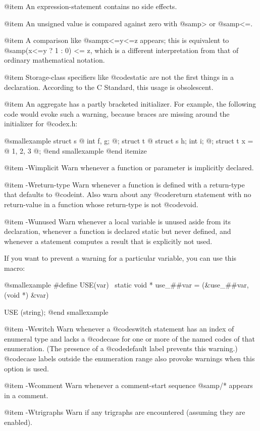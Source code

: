 {@item
An expression-statement contains no side effects.

@item
An unsigned value is compared against zero with @samp{>} or @samp{<=}.

@item
A comparison like @samp{x<=y<=z} appears; this is equivalent to
@samp{(x<=y ? 1 : 0) <= z}, which is a different interpretation from
that of ordinary mathematical notation.

@item
Storage-class specifiers like @code{static} are not the first things in
a declaration.  According to the C Standard, this usage is obsolescent.

@item
An aggregate has a partly bracketed initializer.
For example, the following code would evoke such a warning,
because braces are missing around the initializer for @code{x.h}:

@smallexample
struct s @{ int f, g; @};
struct t @{ struct s h; int i; @};
struct t x = @{ 1, 2, 3 @};
@end smallexample
@end itemize

@item -Wimplicit
Warn whenever a function or parameter is implicitly declared.

@item -Wreturn-type
Warn whenever a function is defined with a return-type that defaults
to @code{int}.  Also warn about any @code{return} statement with no
return-value in a function whose return-type is not @code{void}.

@item -Wunused
Warn whenever a local variable is unused aside from its declaration,
whenever a function is declared static but never defined, and whenever
a statement computes a result that is explicitly not used.

If you want to prevent a warning for a particular variable, you can use
this macro:

@smallexample
#define USE(var) \
  static void * use_##var = (&use_##var, (void *) &var)

USE (string);
@end smallexample

@item -Wswitch
Warn whenever a @code{switch} statement has an index of enumeral type
and lacks a @code{case} for one or more of the named codes of that
enumeration.  (The presence of a @code{default} label prevents this
warning.)  @code{case} labels outside the enumeration range also
provoke warnings when this option is used.

@item -Wcomment
Warn whenever a comment-start sequence @samp{/*} appears in a comment.

@item -Wtrigraphs
Warn if any trigraphs are encountered (assuming they are enabled).

}
